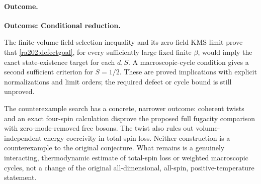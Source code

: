 \documentclass[11pt]{article}
\begin{document}
	\paragraph{Outcome.}
	\textbf{Outcome: Conditional reduction.}
	
	The finite-volume field-selection inequality and its zero-field KMS
	limit prove that \eqref{ra202:defectgoal}, for every sufficiently large
	fixed finite $\beta$, would imply the exact state-existence target for
	each $d,S$. A macroscopic-cycle condition gives a second sufficient
	criterion for $S=1/2$. These are proved implications with explicit
	normalizations and limit orders; the required defect or cycle bound
	is still unproved.
	
	The counterexample search has a concrete, narrower outcome: coherent
	twists and an exact four-spin calculation disprove the proposed full
	fugacity comparison with zero-mode-removed free bosons. The twist also
	rules out volume-independent energy coercivity in total-spin loss.
	Neither construction is a counterexample to the original conjecture.
	What remains is a genuinely interacting, thermodynamic estimate of
	total-spin loss or weighted macroscopic cycles, not a change of the
	original all-dimensional, all-spin, positive-temperature statement.
\end{document}
